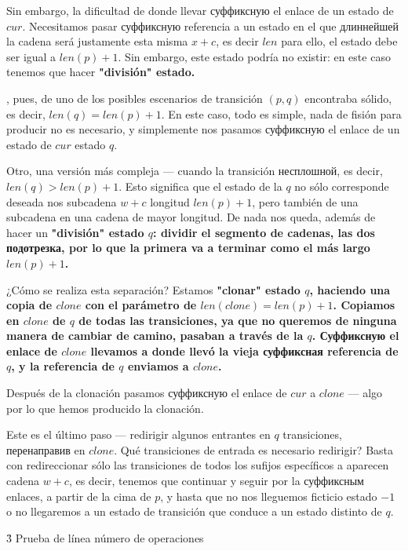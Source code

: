 {Sin embargo, la dificultad de donde llevar суффиксную el enlace de un estado de $cur$. Necesitamos pasar суффиксную referencia a un estado en el que длиннейшей la cadena será justamente esta misma $x+c$, es decir $len$ para ello, el estado debe ser igual a $len(p) + 1$. Sin embargo, este estado podría no existir: en este caso tenemos que hacer \bf{"división"} estado.

\li, pues, de uno de los posibles escenarios de transición $(p,q)$ encontraba sólido, es decir, $len(q) = len(p) + 1$. En este caso, todo es simple, nada de fisión para producir no es necesario, y simplemente nos pasamos суффиксную el enlace de un estado de $cur$ estado $q$.

\li Otro, una versión más compleja --- cuando la transición несплошной, es decir, $len(q) > len(p) + 1$. Esto significa que el estado de la $q$ no sólo corresponde deseada nos subcadena $w+c$ longitud $len(p) + 1$, pero también de una subcadena en una cadena de mayor longitud. De nada nos queda, además de hacer un \bf{"división"} estado $q$: dividir el segmento de cadenas, las dos подотрезка, por lo que la primera va a terminar como el más largo $len(p) + 1$.

¿Cómo se realiza esta separación? Estamos \bf{"clonar"} estado $q$, haciendo una copia de $clone$ con el parámetro de $len(clone) = len(p) + 1$. Copiamos en $clone$ de $q$ de todas las transiciones, ya que no queremos de ninguna manera de cambiar de camino, pasaban a través de la $q$. Суффиксную el enlace de $clone$ llevamos a donde llevó la vieja суффиксная referencia de $q$, y la referencia de $q$ enviamos a $clone$.

Después de la clonación pasamos суффиксную el enlace de $cur$ a $clone$ --- algo por lo que hemos producido la clonación.

Este es el último paso --- redirigir algunos entrantes en $q$ transiciones, перенаправив en $clone$. Qué transiciones de entrada es necesario redirigir? Basta con redireccionar sólo las transiciones de todos los sufijos específicos a aparecen cadena $w+c$, es decir, tenemos que continuar y seguir por la суффиксным enlaces, a partir de la cima de $p$, y hasta que no nos lleguemos ficticio estado $-1$ o no llegaremos a un estado de transición que conduce a un estado distinto de $q$.

}


\h3{ Prueba de línea número de operaciones }


